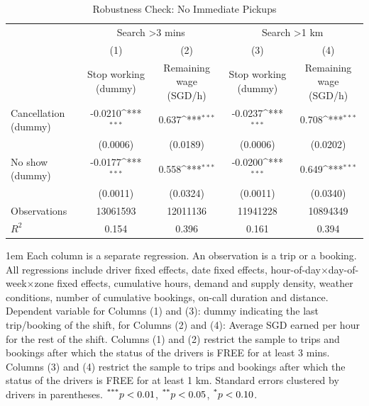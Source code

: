 \documentclass[reviewmode]{restat}
\begin{document}
\begin{table}[]
    \centering
    \footnotesize
    \caption{Robustness Check: No Immediate Pickups}
    \def\sym#1{\ifmmode^{#1}\else\(^{#1}\)\fi}
    \begin{tabularx}{\textwidth}{l@{\extracolsep{\fill}}*{4}{c}}
        \toprule
        \toprule
        &\multicolumn{2}{c}{Search \textgreater 3 mins}&\multicolumn{2}{c}{Search \textgreater 1 km}\\\cmidrule(lr){2-3}\cmidrule(lr){4-5}
        &\multicolumn{1}{c}{(1)}&\multicolumn{1}{c}{(2)}&\multicolumn{1}{c}{(3)}&\multicolumn{1}{c}{(4)}\\
        &\multicolumn{1}{p{2cm}}{\centering Stop working (dummy)}&\multicolumn{1}{p{2cm}}{\centering Remaining wage (SGD/h)}&\multicolumn{1}{p{2cm}}{\centering Stop working (dummy)}&\multicolumn{1}{p{2cm}}{\centering Remaining wage (SGD/h)}\\
        \midrule
        Cancellation (dummy)&     -0.0210\sym{***}&       0.637\sym{***}&     -0.0237\sym{***}&       0.708\sym{***}\\
                            &  (0.0006)&    (0.0189)&  (0.0006)&    (0.0202)\\
        \addlinespace
        No show (dummy) &     -0.0177\sym{***}&       0.558\sym{***}&     -0.0200\sym{***}&       0.649\sym{***}\\
                            &   (0.0011)&    (0.0324)&   (0.0011)&    (0.0340)\\
        \midrule
        Observations        &\num{13061593}&\num{12011136}&\num{11941228}&\num{10894349}\\
        \(R^2\)           &     {0.154}&     {0.396}&     {0.161}&     {0.394}\\
        \bottomrule
    \end{tabularx}
    \label{tb:immepickup}
	\begin{tablenotes}
		\parindent 1em%
		\small
	    Each column is a separate regression. An observation is a trip or a booking. All regressions include driver fixed effects, date fixed effects, hour-of-day\(\times\)day-of-week\(\times\)zone fixed effects, cumulative hours, demand and supply density, weather conditions, number of cumulative bookings, on-call duration and distance. Dependent variable for Columns (1) and (3): dummy indicating the last trip/booking of the shift, for Columns (2) and (4): Average SGD earned per hour for the rest of the shift. Columns (1) and (2) restrict the sample to trips and bookings after which the status of the drivers is FREE for at least 3 mins. Columns (3) and (4) restrict the sample to trips and bookings after which the status of the drivers is FREE for at least 1 km. Standard errors clustered by drivers in parentheses. $\textsuperscript{***}p < 0.01$, $\textsuperscript{**}p < 0.05$, $\textsuperscript{*}p < 0.10$.  
	\end{tablenotes}
\end{table}
\end{document}
